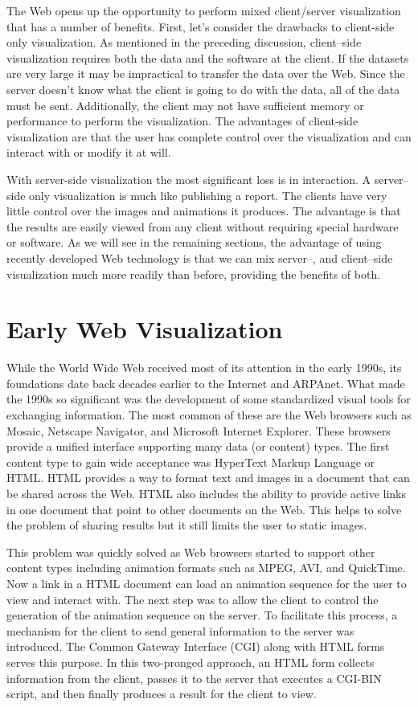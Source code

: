 The Web opens up the opportunity to perform mixed client/server visualization that has a number of benefits. First, let's consider the drawbacks to client-side only visualization. As mentioned in the preceding discussion, client--side visualization requires both the data and the software at the client. If the datasets are very large it may be impractical to transfer the data over the Web. Since the server doesn’t know what the client is going to do with the data, all of the data must be sent. Additionally, the client may not have sufficient memory or performance to perform the visualization. The advantages of client-side visualization are that the user has complete control over the visualization and can interact with or modify it at will.

With server-side visualization the most significant loss is in interaction. A server--side only visualization is much like publishing a report. The clients have very little control over the images and animations it produces. The advantage is that the results are easily viewed from any client without requiring special hardware or software. As we will see in the remaining sections, the advantage of using recently developed Web technology is that we can mix server--, and client--side visualization much more readily than before, providing the benefits of both.

\section{Early Web Visualization}

While the World Wide Web received most of its attention in the early 1990s, its foundations date back decades earlier to the Internet and ARPAnet. What made the 1990s so significant was the development of some standardized visual tools for exchanging information. The most common of these are the Web browsers such as Mosaic, Netscape Navigator, and Microsoft Internet Explorer. These browsers provide a unified interface supporting many data (or content) types. The first content type to gain wide acceptance was HyperText Markup Language or HTML. HTML provides a way to format text and images in a document that can be shared across the Web. HTML also includes the ability to provide active links in one document that point to other documents on the Web. This helps to solve the problem of sharing results but it still limits the user to static images.

This problem was quickly solved as Web browsers started to support other content types including animation formats such as MPEG, AVI, and QuickTime. Now a link in a HTML document can load an animation sequence for the user to view and interact with. The next step was to allow the client to control the generation of the animation sequence on the server. To facilitate this process, a mechanism for the client to send general information to the server was introduced. The Common Gateway Interface (CGI) along with HTML forms serves this purpose. In this two-pronged approach, an HTML form collects information from the client, passes it to the server that executes a CGI-BIN script, and then finally produces a result for the client to view.


